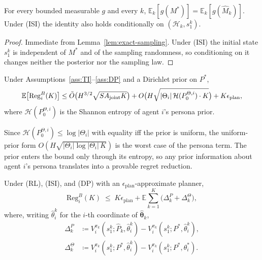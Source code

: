 \begin{lemma}
\label{lem:matching}
For every bounded measurable $g$ and every $k$, $\mathbb{E}_k[g(M^*)] = \mathbb{E}_k[g(\hat M_k)]$. Under (ISI) the identity also holds conditionally on $(\mathcal H_k, s_1^k)$.
\end{lemma}

\begin{proof}
Immediate from Lemma~\ref{lem:exact-sampling}. Under (ISI) the initial state $s_1^k$ is independent of $M^*$ and of the sampling randomness, so conditioning on it changes neither the posterior nor the sampling law.
\end{proof}

\begin{theorem}
\label{thm:main-regret-app}
Under Assumptions~\ref{ass:TI}--\ref{ass:DP} and a Dirichlet prior on $P^*$,
\begin{equation}\label{eq:main-regret-sketch}\resizebox{0.9\linewidth}{!}{$\displaystyle \mathbb{E}\big[\mathrm{Reg}_i^B(K)\big] \leq \tilde O\big(H^{3/2}\sqrt{S A_{\mathrm{joint}} K}\big) + O\big(H\sqrt{|\Theta_i|\,\mathcal H(P_0^{\Theta,i})\cdot K}\big) + K\epsilon_{\mathrm{plan}}, $}\end{equation}
where $\mathcal H(P_0^{\Theta,i})$ is the Shannon entropy of agent $i$'s persona prior.
\end{theorem}

Since $\mathcal H(P_0^{\Theta,i}) \le \log|\Theta_i|$ with equality iff the prior is uniform, the uniform-prior form $O(H\sqrt{|\Theta_i|\log|\Theta_i|\,K})$ is the worst case of the persona term. The prior enters the bound only through its entropy, so any prior information about agent $i$'s persona translates into a provable regret reduction.

\begin{lemma}
\label{lem:decomp}
Under (RL), (ISI), and (DP) with an $\epsilon_{\mathrm{plan}}$-approximate planner,
\begin{equation*}
\mathrm{Reg}_i^B(K) \;\le\; K\epsilon_{\mathrm{plan}} + \mathbb{E}\sum_{k=1}^{K}\big(\Delta_k^{P} + \Delta_k^{\Theta}\big),
\end{equation*}
where, writing $\hat\theta_i^k$ for the $i$-th coordinate of $\hat{\boldsymbol\theta}_k$,
\begin{align*}
\Delta_k^{P} &\coloneqq V_i^{\pi_k}(s_1^k; \hat P_k, \hat\theta_i^k) - V_i^{\pi_k}(s_1^k; P^*, \hat\theta_i^k),\\
\Delta_k^{\Theta} &\coloneqq V_i^{\pi_k}(s_1^k; P^*, \hat\theta_i^k) - V_i^{\pi_k}(s_1^k; P^*, \theta_i^*).
\end{align*}
\end{lemma}

